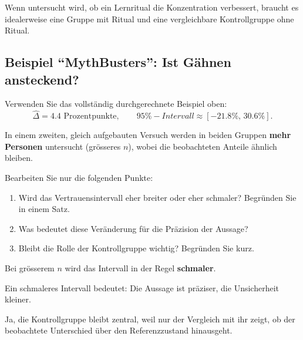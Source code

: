 \begin{myexample}
	Wenn untersucht wird, ob ein Lernritual die Konzentration verbessert, braucht es idealerweise
	eine Gruppe mit Ritual und eine vergleichbare Kontrollgruppe ohne Ritual.
\end{myexample}

\subsection{Beispiel ``MythBusters'': Ist Gähnen ansteckend?}

\begin{myexercise}
	Verwenden Sie das vollständig durchgerechnete Beispiel oben:
	\[
		\hat{\Delta}=4.4\text{ Prozentpunkte},
		\qquad
		95\%-Intervall\approx[-21.8\%,\,30.6\%].
	\]

	In einem zweiten, gleich aufgebauten Versuch werden in beiden Gruppen \textbf{mehr Personen} untersucht (grösseres $n$),
	wobei die beobachteten Anteile ähnlich bleiben.

	Bearbeiten Sie nur die folgenden Punkte:
	\begin{enumerate}
		\item Wird das Vertrauensintervall eher breiter oder eher schmaler? Begründen Sie in einem Satz.
		\item Was bedeutet diese Veränderung für die Präzision der Aussage?
		\item Bleibt die Rolle der Kontrollgruppe wichtig? Begründen Sie kurz.
	\end{enumerate}
	\begin{myanswer}
		Bei grösserem $n$ wird das Intervall in der Regel \textbf{schmaler}.

		Ein schmaleres Intervall bedeutet: Die Aussage ist präziser, die Unsicherheit kleiner.

		Ja, die Kontrollgruppe bleibt zentral, weil nur der Vergleich mit ihr zeigt, ob der beobachtete Unterschied über den Referenzzustand hinausgeht.
	\end{myanswer}
\end{myexercise}

